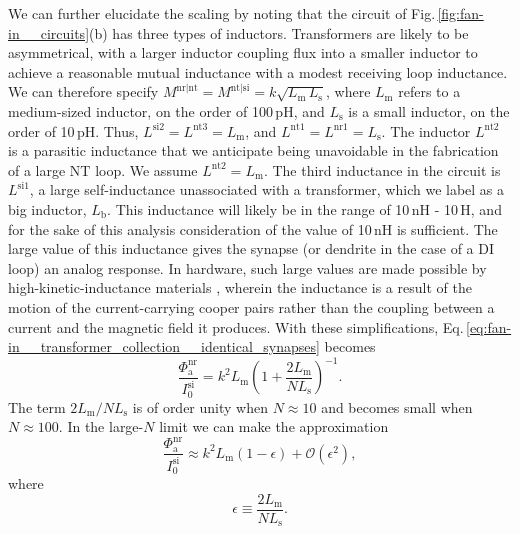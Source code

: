 \documentclass[twocolumn]{article}
\begin{document}
We can further elucidate the scaling by noting that the circuit of Fig.\,\ref{fig:fan-in__circuits}(b) has three types of inductors. Transformers are likely to be asymmetrical, with a larger inductor coupling flux into a smaller inductor to achieve a reasonable mutual inductance with a modest receiving loop inductance. We can therefore specify $M^{\mathrm{nr|nt}} = M^{\mathrm{nt|si}} = k \sqrt{ L_{\mathrm{m}} \, L_{\mathrm{s}}}$, where $L_{\mathrm{m}}$ refers to a medium-sized inductor, on the order of 100\,pH, and $L_{\mathrm{s}}$ is a small inductor, on the order of 10\,pH. Thus, $L^{\mathrm{si2}} = L^{\mathrm{nt3}} = L_{\mathrm{m}}$, and $L^{\mathrm{nt1}} = L^{\mathrm{nr1}} = L_{\mathrm{s}}$. The inductor $L^{\mathrm{nt2}}$ is a parasitic inductance that we anticipate being unavoidable in the fabrication of a large NT loop. We assume $L^{\mathrm{nt2}} = L_{\mathrm{m}}$. The third inductance in the circuit is $L^{\mathrm{si1}}$, a large self-inductance unassociated with a transformer, which we label as a big inductor, $L_{\mathrm{b}}$. This inductance will likely be in the range of 10\,nH - 10\,\textmu H, and for the sake of this analysis consideration of the value of 10\,nH is sufficient. The large value of this inductance gives the synapse (or dendrite in the case of a DI loop) an analog response. In hardware, such large values are made possible by high-kinetic-inductance materials \cite{}, wherein the inductance is a result of the motion of the current-carrying cooper pairs rather than the coupling between a current and the magnetic field it produces. With these simplifications, Eq.\,\ref{eq:fan-in__transformer_collection__identical_synapses} becomes
\begin{equation}
\label{eq:fan-in__transformer_collection__three_inductances}
\frac{ \Phi_{\mathrm{a}}^{\mathrm{nr}} }{ I^{\mathrm{si}}_0 } = k^2 L_{\mathrm{m}} \left( 1 + \frac{2L_{\mathrm{m}}}{NL_{\mathrm{s}}} \right)^{-1}.
\end{equation}
The term $2L_{\mathrm{m}}/NL_{\mathrm{s}}$ is of order unity when $N\approx 10$ and becomes small when $N \approx 100$. In the large-$N$ limit we can make the approximation
\begin{equation}
\label{eq:fan-in__transformer_collection__large_N}
\frac{ \Phi_{\mathrm{a}}^{\mathrm{nr}} }{ I^{\mathrm{si}}_0 } \approx k^2 L_{\mathrm{m}} \left( 1 - \epsilon \right) + \mathcal{O}(\epsilon^2),
\end{equation}
where
\begin{equation}
\label{eq:fan-in__transformer_collection__epsilon}
\epsilon \equiv \frac{ 2L_{\mathrm{m}} }{ N L_{\mathrm{s}} }.
\end{equation}
\end{document}
